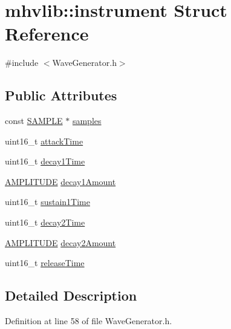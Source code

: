 \hypertarget{structmhvlib_1_1instrument}{\section{mhvlib\-:\-:instrument Struct Reference}
\label{structmhvlib_1_1instrument}
}


{\ttfamily \#include $<$Wave\-Generator.\-h$>$}

\subsection*{Public Attributes}
\begin{DoxyCompactItemize}
\item 
const \hyperlink{_d_a_c_8h_a5a6d1dc37ffa32957a63868cd1da39b3}{S\-A\-M\-P\-L\-E} $\ast$ \hyperlink{structmhvlib_1_1instrument_a055994ae16bd874787ad27b2132c7ea7}{samples}
\item 
uint16\-\_\-t \hyperlink{structmhvlib_1_1instrument_a0d05a7a3daa565dabc52684acd044e72}{attack\-Time}
\item 
uint16\-\_\-t \hyperlink{structmhvlib_1_1instrument_a7f1d44aca6041666220e502a00ac8553}{decay1\-Time}
\item 
\hyperlink{namespacemhvlib_a15ca117fe572109e56c947a4c6612e7e}{A\-M\-P\-L\-I\-T\-U\-D\-E} \hyperlink{structmhvlib_1_1instrument_a5a2bccc6b70888b36c503d3b4ecbb9da}{decay1\-Amount}
\item 
uint16\-\_\-t \hyperlink{structmhvlib_1_1instrument_afc30f5d6ff3a965dc7eca798afca2eb8}{sustain1\-Time}
\item 
uint16\-\_\-t \hyperlink{structmhvlib_1_1instrument_a61f12f07350d2930caf3dac23521dc76}{decay2\-Time}
\item 
\hyperlink{namespacemhvlib_a15ca117fe572109e56c947a4c6612e7e}{A\-M\-P\-L\-I\-T\-U\-D\-E} \hyperlink{structmhvlib_1_1instrument_a51c971bdc3fe7b675f0fb1cfe42e48c5}{decay2\-Amount}
\item 
uint16\-\_\-t \hyperlink{structmhvlib_1_1instrument_a8434571b2e69adf17e76ee3d1b4d9dd3}{release\-Time}
\end{DoxyCompactItemize}


\subsection{Detailed Description}


Definition at line 58 of file Wave\-Generator.\-h.



